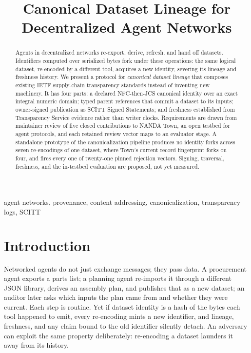 \documentclass[conference]{IEEEtran}
\begin{document}
\title{Canonical Dataset Lineage for\\Decentralized Agent Networks}

\author{
}

\maketitle

\begin{abstract}
Agents in decentralized networks re-export, derive, refresh, and hand off datasets. Identifiers computed over serialized bytes fork under these operations: the same logical dataset, re-encoded by a different tool, acquires a new identity, severing its lineage and freshness history. We present a protocol for \emph{canonical dataset lineage} that composes existing IETF supply-chain transparency standards instead of inventing new machinery. It has four parts: a declared NFC-then-JCS canonical identity over an exact integral numeric domain; typed parent references that commit a dataset to its inputs; owner-signed publication as SCITT Signed Statements; and freshness established from Transparency Service evidence rather than writer clocks. Requirements are drawn from maintainer review of five closed contributions to NANDA Town, an open testbed for agent protocols, and each retained review vector maps to an evaluator stage. A standalone prototype of the canonicalization pipeline produces no identity forks across seven re-encodings of one dataset, where Town's current record fingerprint forks on four, and fires every one of twenty-one pinned rejection vectors. Signing, traversal, freshness, and the in-testbed evaluation are proposed, not yet measured.
\end{abstract}

\begin{IEEEkeywords}
agent networks, provenance, content addressing, canonicalization, transparency logs, SCITT
\end{IEEEkeywords}

\section{Introduction}

Networked agents do not just exchange messages; they pass data. A procurement agent exports a parts list; a planning agent re-imports it through a different JSON library, derives an assembly plan, and publishes that as a new dataset; an auditor later asks which inputs the plan came from and whether they were current. Each step is routine. Yet if dataset identity is a hash of the bytes each tool happened to emit, every re-encoding mints a new identifier, and lineage, freshness, and any claim bound to the old identifier silently detach. An adversary can exploit the same property deliberately: re-encoding a dataset launders it away from its history.
\end{document}
